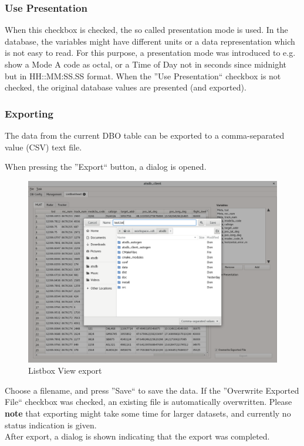 \documentclass[10pt,letterpaper,extrafontsizes]{memoir}
\begin{document}
\subsubsection{Use Presentation}
When this checkbox is checked, the so called presentation mode is used. In the database, the variables might have different units or a data representation which is not easy to read. For this purpose, a presentation mode was introduced to e.g. show a Mode A code as octal, or a Time of Day not in seconds since midnight but in HH::MM:SS.SS format. When the ''Use Presentation`` checkbox is not checked, the original database values are presented (and exported).

\subsubsection{Exporting}

The data from the current DBO table can be exported to a comma-separated value (CSV) text file. 

When pressing the ''Export`` button, a dialog is opened.

\begin{figure}[H]
    \hspace*{-2cm}
    \includegraphics[width=18cm]{../screenshots/listbox_export.png}
  \caption{Listbox View export}
  \label{fig:listbox_export}
\end{figure}

Choose a filename, and press ''Save`` to save the data. If the ''Overwrite Exported File`` checkbox was checked, an existing file is automatically overwritten. Please \textbf{note} that exporting might take some time for larger datasets, and currently no status indication is given.\\
After export, a dialog is shown indicating that the export was completed.
\end{document}
